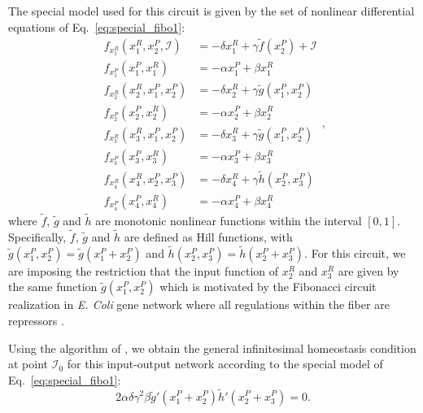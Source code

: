 The special model \cite{stochs_gene_2005,homeostasis_antonelli2018} used for this circuit is given by the set 
of nonlinear differential equations of Eq.~\ref{eq:special_fibo1}:
\begin{equation} \label{eq:special_fibo1}
    \begin{aligned} f_{x_1^R}(x_1^R, x_2^P, \mathcal{I}) &= -\delta x_1^R + \gamma\tilde{f}(x_2^P) + \mathcal{I}\\ 
        f_{x_1^P}(x_1^P, x_1^R) &= -\alpha x_1^P + \beta x_1^R \\ 
        f_{x_2^R}(x_2^R, x_1^P, x_2^P) &= -\delta x_2^R + \gamma\tilde{g}(x_1^P, x_2^P) \\ 
        f_{x_2^P}(x_2^P, x_2^R) &= -\alpha x_2^P + \beta x_2^R   \\ 
        f_{x_3^R}(x_3^R, x_1^P, x_2^P) &= -\delta x_3^R + \gamma \tilde{g}(x_1^P,x_2^P) \\ 
        f_{x_3^P}(x_3^P, x_3^R) &= -\alpha x_3^P + \beta x_3^R \\ 
        f_{x_4^R}(x_4^R, x_2^P, x_3^P) &= -\delta x_4^R + \gamma \tilde{h}(x_2^P, x_3^P) \\ 
        f_{x_4^P}(x_4^P, x_4^R) &= -\alpha x_4^P + \beta x_4^R
    \end{aligned},
\end{equation}
where $\tilde{f}$, $\tilde{g}$ and $\tilde{h}$ are monotonic nonlinear functions within the interval $[0,1]$. 
Specifically, $\tilde{f}$, $\tilde{g}$ and $\tilde{h}$ are defined as Hill functions,
with $\tilde{g}(x_1^P, x_2^P) = \tilde{g}(x_1^P + x_2^P)$ and $\tilde{h}(x_2^P, x_3^P) = \tilde{h}(x_2^P + x_3^P)$.
For this circuit, we are imposing the restriction that the input function of $x_2^R$ and $x_3^R$ are given 
by the same function $\tilde{g}(x_1^P, x_2^P)$ which is motivated by the Fibonacci circuit realization in 
\textit{E. Coli} gene network where all regulations within the fiber are repressors \cite{morone2020}.

Using the algorithm of \cite{wang2021}, we obtain the general infinitesimal homeostasis condition at 
point $\mathcal{I}_0$ for this input-output network according to the special model of 
Eq.~\ref{eq:special_fibo1}:
\begin{equation} \label{eq:special_infhom_fibo}
    2\alpha\delta\gamma^2\beta\tilde{g}'(x_1^P + x_2^P)\tilde{h}'(x_2^P + x_3^P) = 0.
\end{equation} 

